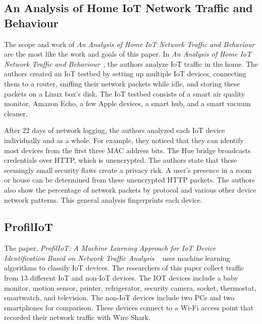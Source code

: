 \subsection{An Analysis of Home IoT Network Traffic and Behaviour}
\label{homeIoTPaper}
The scope and work of \textit{An Analysis of Home IoT Network Traffic and Behaviour}~\cite{home_iot} are the most like the work and goals of this paper. In \textit{An Analysis of Home IoT Network Traffic and Behaviour}~\cite{home_iot}, the authors analyze IoT traffic in the home. The authors created an IoT testbed by setting up multiple IoT devices, connecting them to a router, sniffing their network packets while idle, and storing these packets on a Linux box's disk. The IoT testbed consists of a smart air quality monitor, Amazon Echo, a few Apple devices, a smart hub, and a smart vacuum cleaner.

After 22 days of network logging, the authors analyzed each IoT device individually and as a whole. For example, they noticed that they can identify most devices from the first three MAC address bits. The Hue bridge broadcasts credentials over HTTP, which is unencrypted. The authors state that these seemingly small security flaws create a privacy risk. A user’s presence in a room or house can be determined from these unencrypted HTTP packets. The authors also show the percentage of network packets by protocol and various other device network patterns. This general analysis fingerprints each device.

\subsection{ProfilIoT}
\label{ProfilIoTPaper}
The paper, \textit{ProfilIoT: A Machine Learning Approach for IoT Device Identification Based on Network Traffic Analysis} ~\cite{Meidan:2017:PML:3019612.3019878} uses machine learning algorithms to classify IoT devices. The researchers of this paper collect traffic from 13 different IoT and non-IoT devices. The IOT devices include a baby monitor, motion sensor, printer, refrigerator, security camera, socket, thermostat, smartwatch, and television. The non-IoT devices include two PCs and two smartphones for comparison. These devices connect to a Wi-Fi access point that recorded their network traffic with Wire Shark\cite{wireshark}.

